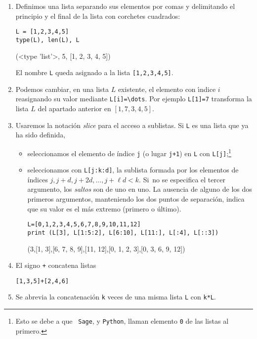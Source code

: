 \begin{enumerate}
 \item Definimos una lista separando sus elementos por comas y delimitando el
principio y
el final de la lista con corchetes cuadrados:
\begin{lstlisting}[numbers=none]
L = [1,2,3,4,5]
type(L), len(L), L
\end{lstlisting}
\begin{Output}
	(<type 'list'>, 5, [1, 2, 3, 4, 5])
\end{Output}

El nombre \lstinline|L| queda asignado a la lista \lstinline|[1,2,3,4,5]|. 
\item Podemos cambiar, en una lista $L$ existente, el elemento con \'{\i}ndice
$i$ reasignando su valor mediante \lstinline|L[i]=\dots|. Por ejemplo
\lstinline|L[1]=7| transforma la lista
$L$ del apartado anterior en $[1,7,3,4,5]$.
\item Usaremos la notación \emph{slice} 
para el acceso a sublistas. Si \lstinline|L| es una lista que ya ha sido
definida, 
\begin{itemize}
 \item seleccionamos el elemento de índice {\tt j} (o lugar {\tt j+1}) en
\lstinline|L|
con \lstinline|L[j]|;\footnote{Esto se debe a que {\tt
Sage}, y {\tt Python},  llaman elemento {\tt 0} de las listas al primero.}

\item seleccionamos con \lstinline|L[j:k:d]|, la sublista formada por los
elementos de
índices $j,j+d,j+2d,..., j+\ell d<k$. Si~no se
especifica el tercer argumento, los \emph{saltos} son de uno en uno. La ausencia
de
alguno de los dos primeros argumentos, manteniendo los dos
puntos de separación, indica que su valor es el más extremo (primero o último).
\begin{lstlisting}
L=[0,1,2,3,4,5,6,7,8,9,10,11,12]
print (L[3], L[1:5:2], L[6:10], L[11:], L[:4], L[::3])
\end{lstlisting}

\begin{Output}
	(3,[1, 3],[6, 7, 8, 9],[11, 12],[0, 1, 2, 3],[0, 3, 6, 9, 12])
\end{Output}

\end{itemize}
\item El signo \lstinline|+| concatena listas
\begin{lstlisting}
[1,3,5]+[2,4,6] 
\end{lstlisting}
\begin{Output}
	[1, 3, 5, 2, 4, 6]
\end{Output}

\item Se abrevia la concatenación  \lstinline|k| veces de una misma lista
\lstinline|L|
con \lstinline|k*L|. 


\end{enumerate}
